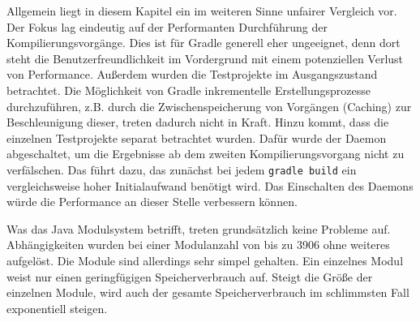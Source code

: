 Allgemein liegt in diesem Kapitel ein im weiteren Sinne unfairer Vergleich vor.
Der Fokus lag eindeutig auf der Performanten Durchführung der Kompilierungsvorgänge. Dies ist für Gradle generell eher ungeeignet, denn dort steht die Benutzerfreundlichkeit im Vordergrund mit einem potenziellen Verlust von Performance. 
Außerdem wurden die Testprojekte im Ausgangszustand betrachtet. Die Möglichkeit von Gradle inkrementelle Erstellungsprozesse durchzuführen, z.B. durch die Zwischenspeicherung von Vorgängen (Caching) zur Beschleunigung dieser, treten dadurch nicht in Kraft. 
Hinzu kommt, dass die einzelnen Testprojekte separat betrachtet wurden. Dafür wurde der Daemon abgeschaltet, um die Ergebnisse ab dem zweiten Kompilierungsvorgang nicht zu verfälschen. Das führt dazu, das zunächst bei jedem \texttt{gradle build} ein vergleichsweise hoher Initialaufwand benötigt wird. Das Einschalten des Daemons würde die Performance an dieser Stelle verbessern können.

Was das Java Modulsystem betrifft, treten grundsätzlich keine Probleme auf. Abhängigkeiten wurden bei einer Modulanzahl von bis zu 3906 ohne weiteres aufgelöst. Die Module sind allerdings sehr simpel gehalten. Ein einzelnes Modul weist nur einen geringfügigen Speicherverbrauch auf. Steigt die Größe der einzelnen Module, wird auch der gesamte Speicherverbrauch im schlimmsten Fall exponentiell steigen.
